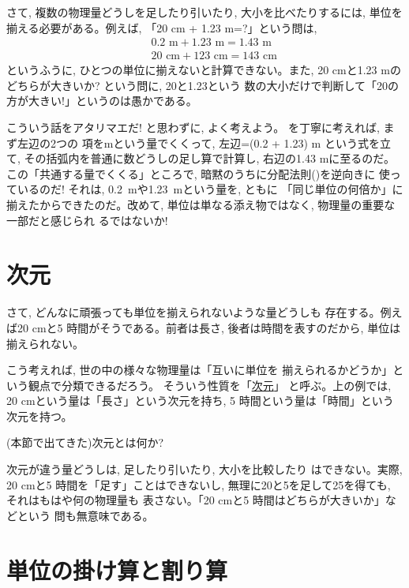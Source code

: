 さて, 複数の物理量どうしを足したり引いたり, 大小を比べたりするには, 
単位を揃える必要がある。例えば, 「20 cm + 1.23 m=?」という問は, 
\begin{eqnarray}
&&0.2\text{ m} + 1.23\text{ m} = 1.43\text{ m}\label{eq:0.2m+1.23m}\\
&&20\text{ cm} + 123\text{ cm} = 143\text{ cm}\label{eq:20cm+123cm}
\end{eqnarray}
というふうに, ひとつの単位に揃えないと計算できない。また, 
20 cmと1.23 mのどちらが大きいか? という問に, 20と1.23という
数の大小だけで判断して「20の方が大きい!」というのは愚かである。

こういう話をアタリマエだ! と思わずに, よく考えよう。
を丁寧に考えれば, まず左辺の2つの
項をmという量でくくって, 左辺=(0.2 + 1.23) m
という式を立て, その括弧内を普通に数どうしの足し算で計算し, 
右辺の1.43 mに至るのだ。この「共通する量でくくる」ところで, 
暗黙のうちに分配法則()を逆向きに
使っているのだ! それは, 0.2~mや1.23~mという量を, ともに
「同じ単位の何倍か」に揃えたからできたのだ。改めて, 
単位は単なる添え物ではなく, 物理量の重要な一部だと感じられ
るではないか!\mv

\section{次元}

さて, どんなに頑張っても単位を揃えられないような量どうしも
存在する。例えば20 cmと5 時間がそうである。前者は長さ, 
後者は時間を表すのだから, 単位は揃えられない。

こう考えれば, 世の中の様々な物理量は「互いに単位を
揃えられるかどうか」という観点で分類できるだろう。
そういう性質を「\underline{次元}」
と呼ぶ。上の例では, 20 cmという量は「長さ」という次元を持ち, 
5 時間という量は「時間」という次元を持つ。\mv

\begin{q}\label{q:alg_dim00} (本節で出てきた)次元とは何か?\end{q}

次元が違う量どうしは, 足したり引いたり, 大小を比較したり
はできない。実際, 20 cmと5 時間を「足す」ことはできないし, 
無理に20と5を足して25を得ても, それはもはや何の物理量も
表さない。「20 cmと5 時間はどちらが大きいか」などという
問も無意味である。\\



\section{単位の掛け算と割り算}\label{sect:unit_mult_div}

